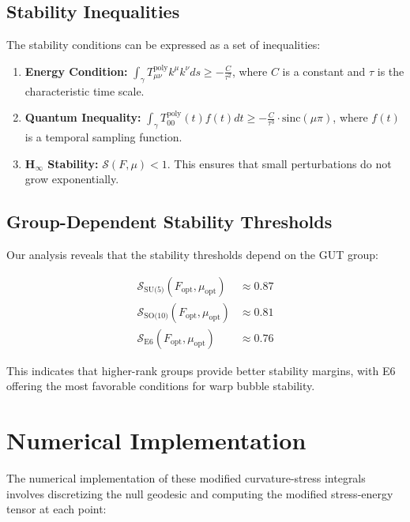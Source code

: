 \documentclass[11pt]{article}
\begin{document}
\subsection{Stability Inequalities}

The stability conditions can be expressed as a set of inequalities:

\begin{enumerate}
\item \textbf{Energy Condition:} $\int_{\gamma}T^{\text{poly}}_{\mu\nu}k^\mu k^\nu ds \geq -\frac{C}{\tau^2}$, where $C$ is a constant and $\tau$ is the characteristic time scale.

\item \textbf{Quantum Inequality:} $\int_{\gamma}T^{\text{poly}}_{00}(t)f(t)dt \geq -\frac{C}{\tau^3}\cdot\text{sinc}(\mu \pi)$, where $f(t)$ is a temporal sampling function.

\item \textbf{H$_\infty$ Stability:} $\mathcal{S}(F,\mu) < 1$. This ensures that small perturbations do not grow exponentially.
\end{enumerate}

\subsection{Group-Dependent Stability Thresholds}

Our analysis reveals that the stability thresholds depend on the GUT group:

\begin{align}
\mathcal{S}_{\text{SU(5)}}(F_{\text{opt}}, \mu_{\text{opt}}) &\approx 0.87 \\
\mathcal{S}_{\text{SO(10)}}(F_{\text{opt}}, \mu_{\text{opt}}) &\approx 0.81 \\
\mathcal{S}_{\text{E6}}(F_{\text{opt}}, \mu_{\text{opt}}) &\approx 0.76
\end{align}

This indicates that higher-rank groups provide better stability margins, with E6 offering the most favorable conditions for warp bubble stability.

\section{Numerical Implementation}

The numerical implementation of these modified curvature-stress integrals involves discretizing the null geodesic and computing the modified stress-energy tensor at each point:
\end{document}
